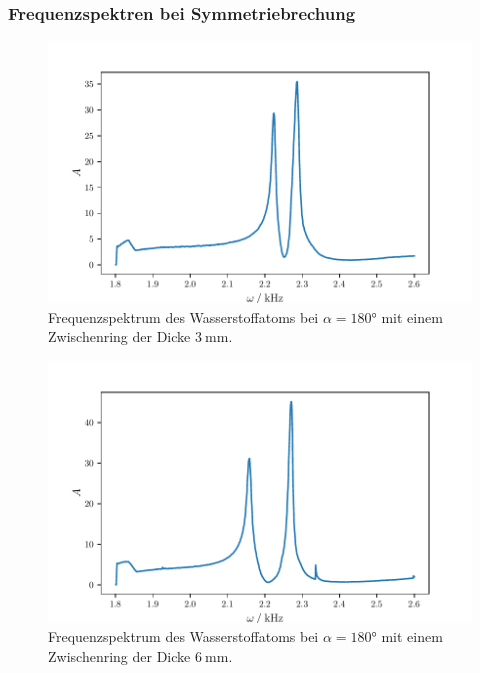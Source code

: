 \subsubsection{Frequenzspektren bei Symmetriebrechung}
\begin{figure}
    \centering
    \includegraphics{build/h3ring.pdf}
    \caption{Frequenzspektrum des Wasserstoffatoms bei $\alpha = \ang{180}$ mit einem Zwischenring der Dicke $\qty{3}{\milli\meter}$.}
    \label{fig:h3ring}
\end{figure}
\begin{figure}
    \centering
    \includegraphics{build/h6ring.pdf}
    \caption{Frequenzspektrum des Wasserstoffatoms bei $\alpha = \ang{180}$ mit einem Zwischenring der Dicke $\qty{6}{\milli\meter}$.}
    \label{fig:h6ring}
\end{figure}
